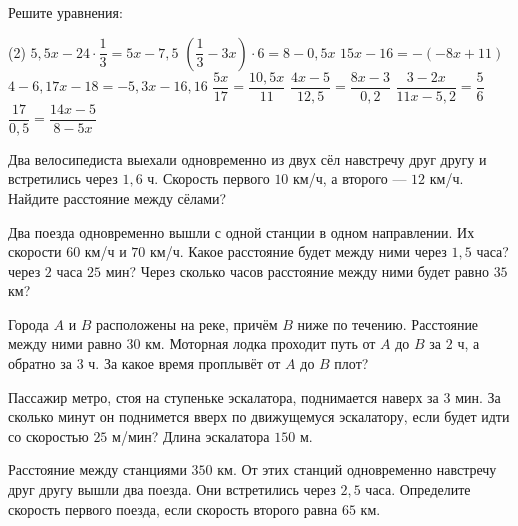 \begin{class}[number=2]
	\begin{listofex}
		\item Решите уравнения:
		\begin{tasks}(2)
			\task \( 5,5x-24\cdot \dfrac{ 1 }{ 3 }=5x-7,5 \)
			\task \( \left( \dfrac{ 1 }{ 3 } - 3x \right)\cdot 6 = 8-0,5x \)
			\task \( 15x-16=-(-8x+11) \)
			\task \( 4-6,17x-18=-5,3x-16,16 \)
			\task \( \dfrac{ 5x }{ 17 }=\dfrac{ 10,5x }{ 11 } \)
			\task \( \dfrac{ 4x-5 }{ 12,5 }=\dfrac{ 8x-3 }{ 0,2 } \)
			\task \( \dfrac{ 3-2x }{ 11x-5,2 }=\dfrac{ 5 }{ 6 } \)
			\task \( \dfrac{ 17 }{ 0,5 }=\dfrac{ 14x-5 }{ 8-5x } \)
		\end{tasks}
		\item Два велосипедиста выехали одновременно из двух сёл навстречу друг другу и встретились через \(1,6\) ч. Скорость первого \(10\) км/ч, а второго --- \(12\) км/ч. Найдите расстояние между сёлами?
		\item Два поезда одновременно вышли с одной станции в одном направлении. Их скорости \(60\) км/ч и \(70\) км/ч. Какое расстояние будет между ними через \(1,5\) часа? через \(2\) часа \(25\) мин? Через сколько часов расстояние между ними будет равно \(35\) км?
		\item Города \(A\) и \(B\) расположены на реке, причём \(B\) ниже по течению. Расстояние между ними равно \(30\) км. Моторная лодка проходит путь от \(A\) до \(B\) за \(2\) ч, а обратно за \(3\) ч. За какое время проплывёт от \(A\) до \(B\) плот?
		\item Пассажир метро, стоя на ступеньке эскалатора, поднимается наверх за \(3\) мин. За сколько минут он поднимется вверх по движущемуся эскалатору, если будет идти со скоростью \(25\) м/мин? Длина эскалатора \(150\) м.
		\item Расстояние между станциями \(350\) км. От этих станций одновременно навстречу друг другу вышли два поезда. Они встретились через \(2,5\) часа. Определите скорость первого поезда, если скорость второго равна \(65\) км.
	\end{listofex}
\end{class}

